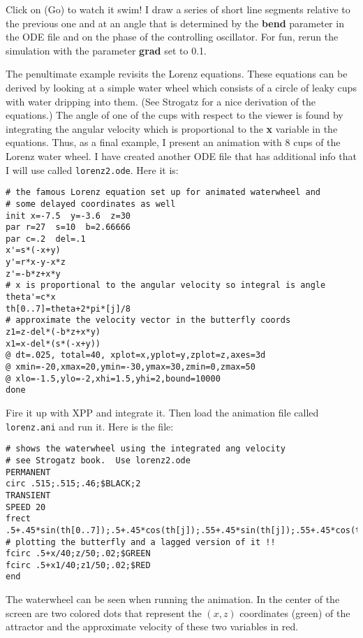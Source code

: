 \documentclass{article}
\begin{document}
Click on (Go) to watch it swim! I draw a series of short
line segments relative to the previous one and at an angle that is
determined by the {\bf bend} parameter in the ODE file and on the
phase of the controlling oscillator. For fun, rerun the simulation
with the parameter {\bf grad} set to 0.1.  

\medskip

The penultimate example revisits the Lorenz equations. These equations can
be derived by looking at a simple water wheel which consists of a
circle of leaky cups with water dripping into them. (See Strogatz for
a nice derivation of the equations.) The angle of one of the cups with
respect to the viewer is found by integrating the angular velocity
which is proportional to the {\bf x} variable in the equations. Thus,
as a final example, I present an animation with 8 cups of the Lorenz
water wheel.  I have created another ODE file that has additional info
that I will use called {\tt lorenz2.ode}.  Here it is:
\begin{verbatim}
# the famous Lorenz equation set up for animated waterwheel and
# some delayed coordinates as well
init x=-7.5  y=-3.6  z=30
par r=27  s=10  b=2.66666
par c=.2  del=.1
x'=s*(-x+y)
y'=r*x-y-x*z
z'=-b*z+x*y
# x is proportional to the angular velocity so integral is angle
theta'=c*x
th[0..7]=theta+2*pi*[j]/8
# approximate the velocity vector in the butterfly coords
z1=z-del*(-b*z+x*y)
x1=x-del*(s*(-x+y))
@ dt=.025, total=40, xplot=x,yplot=y,zplot=z,axes=3d
@ xmin=-20,xmax=20,ymin=-30,ymax=30,zmin=0,zmax=50
@ xlo=-1.5,ylo=-2,xhi=1.5,yhi=2,bound=10000
done
\end{verbatim}

Fire it up with XPP and integrate it.  Then load the animation file
called {\tt lorenz.ani} and run it. Here is the file:
\begin{verbatim}
# shows the waterwheel using the integrated ang velocity
# see Strogatz book.  Use lorenz2.ode
PERMANENT 
circ .515;.515;.46;$BLACK;2
TRANSIENT
SPEED 20
frect .5+.45*sin(th[0..7]);.5+.45*cos(th[j]);.55+.45*sin(th[j]);.55+.45*cos(th[j]);$BLACK
# plotting the butterfly and a lagged version of it !!
fcirc .5+x/40;z/50;.02;$GREEN
fcirc .5+x1/40;z1/50;.02;$RED
end
\end{verbatim}

The waterwheel can be seen when running the animation. In the center
of the screen are two colored dots that represent the $(x,z)$
coordinates (green) of the attractor and the approximate velocity of
these two variables in red.
\end{document}
